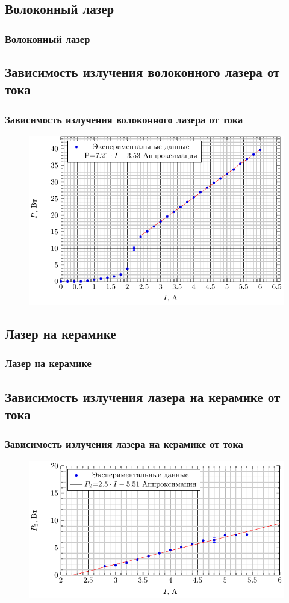\documentclass[10pt,pdf,hyperref={unicode}, dvipsnames]{beamer}
\newcommand\frametitless[1]{\subsection{#1}\frametitle{#1}}
\begin{document}
\begin{frame}[t]
	\frametitless{Волоконный лазер}
	
\end{frame}
\begin{frame}[t]
	\frametitless{Зависимость излучения волоконного лазера от тока}
		\begin{figure}[tb]
		\centering
		\includegraphics[]{img/PI}
	\end{figure}
\end{frame}
\begin{frame}[t]
	\frametitless{Лазер на керамике}
	
\end{frame}
\begin{frame}[t]
	\frametitless{Зависимость излучения лазера на керамике от тока}
		\begin{figure}[tb]
		\centering
		\includegraphics[]{img/P2I}
	\end{figure}
\end{frame}
\end{document}
